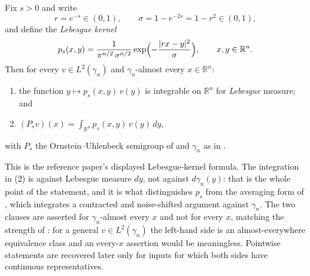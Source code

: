 \begin{lemma}
Fix $s > 0$ and write
\[
  r = e^{-s} \in (0,1), \qquad \sigma = 1 - e^{-2s} = 1 - r^2 \in (0,1),
\]
and define the \emph{Lebesgue kernel}
\[
  p_s(x,y) = \frac{1}{\pi^{n/2}\,\sigma^{n/2}}
    \exp\Bigl(-\frac{|rx-y|^2}{\sigma}\Bigr),
  \qquad x, y \in \mathbb{R}^n .
\]
Then for every $v \in L^2(\gamma_n)$ and $\gamma_n$-almost every $x \in \mathbb{R}^n$:
\begin{enumerate}
\item the function $y \mapsto p_s(x,y)\,v(y)$ is integrable on $\mathbb{R}^n$ for
\emph{Lebesgue} measure; and
\item $\displaystyle (P_s v)(x) = \int_{\mathbb{R}^n} p_s(x,y)\,v(y)\,dy$,
\end{enumerate}
with $P_s$ the Ornstein--Uhlenbeck semigroup of  and
$\gamma_n$ as in .

This is the reference paper's displayed Lebesgue-kernel formula.  The integration
in (2) is against Lebesgue measure $dy$, not against $d\gamma_n(y)$: that is the
whole point of the statement, and it is what distinguishes $p_s$ from the
averaging form of , which integrates a contracted and
noise-shifted argument against $\gamma_n$.  The two clauses are asserted for
$\gamma_n$-almost every $x$ and not for every $x$, matching the strength of
: for a general $v \in L^2(\gamma_n)$ the left-hand side is
an almost-everywhere equivalence class and an every-$x$ assertion would be
meaningless.  Pointwise statements are recovered later only for inputs for which
both sides have continuous representatives.
\end{lemma}
